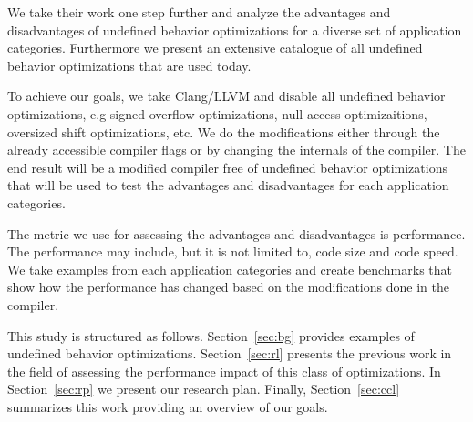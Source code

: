 We take their work one step further and analyze the advantages and
disadvantages of undefined behavior optimizations for a diverse set of
application categories. Furthermore we present an extensive catalogue of
all undefined behavior optimizations that are used today.

To achieve our goals, we take Clang/LLVM and disable all undefined
behavior optimizations, e.g signed overflow optimizations, null access
optimizaitions, oversized shift optimizations, etc. We do the
modifications either through the already accessible compiler flags or by
changing the internals of the compiler. The end result will be a
modified compiler free of undefined behavior optimizations that will be
used to test the advantages and disadvantages for each application
categories.

The metric we use for assessing the advantages and disadvantages is
performance. The performance may include, but it is not limited to, code
size and code speed. We take examples from each application categories
and create benchmarks that show how the performance has changed based on
the modifications done in the compiler.

This study is structured as follows. Section~\ref{sec:bg} provides
examples of undefined behavior optimizations. Section~\ref{sec:rl}
presents the previous work in the field of assessing the performance
impact of this class of optimizations. In Section~\ref{sec:rp} we
present our research plan. Finally, Section~\ref{sec:ccl} summarizes
this work providing an overview of our goals.

